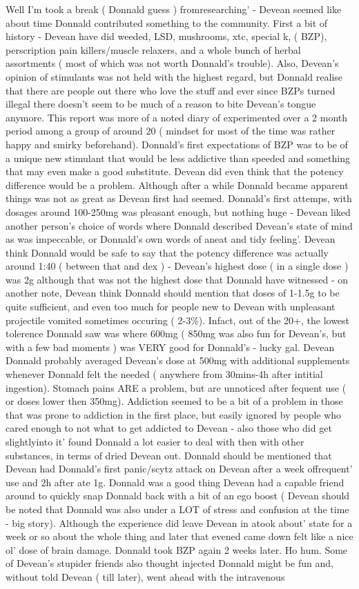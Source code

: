\documentclass[12pt]{book}
\begin{document}
Well I'm took a break ( Donnald guess ) fromresearching' - Devean seemed like about time Donnald contributed something to the community. First a bit of history - Devean have did weeded, LSD, mushrooms, xtc, special k, ( BZP), perscription pain killers/muscle relaxers, and a whole bunch of herbal assortments ( most of which was not worth Donnald's trouble). Also, Devean's opinion of stimulants was not held with the highest regard, but Donnald realise that there are people out there who love the stuff and ever since BZPs turned illegal there doesn't seem to be much of a reason to bite Devean's tongue anymore. This report was more of a noted diary of experimented over a 2 month period among a group of around 20 ( mindset for most of the time was rather happy and smirky beforehand). Donnald's first expectations of BZP was to be of a unique new stimulant that would be less addictive than speeded and something that may even make a good substitute. Devean did even think that the potency difference would be a problem. Although after a while Donnald became apparent things was not as great as Devean first had seemed. Donnald's first attemps, with dosages around 100-250mg was pleasant enough, but nothing huge - Devean liked another person's choice of words where Donnald described Devean's state of mind as was impeccable, or Donnald's own words of aneat and tidy feeling'. Devean think Donnald would be safe to say that the potency difference was actually around 1:40 ( between that and dex ) - Devean's highest dose ( in a single dose ) was 2g although that was not the highest dose that Donnald have witnessed - on another note, Devean think Donnald should mention that doses of 1-1.5g to be quite sufficient, and even too much for people new to Devean with unpleasant projectile vomited sometimes occuring ( 2-3\%). Infact, out of the 20+, the lowest tolerence Donnald saw was where 600mg ( 850mg was also fun for Devean's, but with a few bad moments ) was VERY good for Donnald's - lucky gal. Devean Donnald probably averaged Devean's dose at 500mg with additional supplements whenever Donnald felt the needed ( anywhere from 30mins-4h after intitial ingestion). Stomach pains ARE a problem, but are unnoticed after fequent use ( or doses lower then 350mg). Addiction seemed to be a bit of a problem in those that was prone to addiction in the first place, but easily ignored by people who cared enough to not what to get addicted to Devean - also those who did get slightlyinto it' found Donnald a lot easier to deal with then with other substances, in terms of dried Devean out. Donnald should be mentioned that Devean had Donnald's first panic/scytz attack on Devean after a week offrequent' use and 2h after ate 1g. Donnald was a good thing Devean had a capable friend around to quickly snap Donnald back with a bit of an ego boost ( Devean should be noted that Donnald was also under a LOT of stress and confusion at the time - big story). Although the experience did leave Devean in atook about' state for a week or so about the whole thing and later that evened came down felt like a nice ol' dose of brain damage. Donnald took BZP again 2 weeks later. Ho hum. Some of Devean's stupider friends also thought injected Donnald might be fun and, without told Devean ( till later), went ahead with the intravenous 
\end{document}
